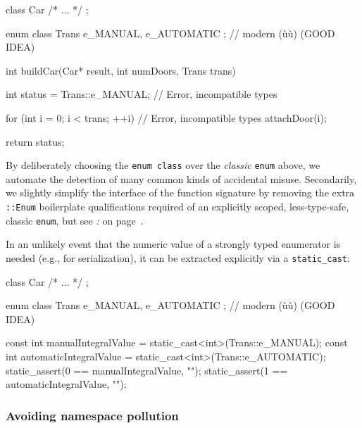 \begin{emcppslisting}[emcppsignore={Fails to build with all Declarations marked Error}]
class Car { /* ... */ };

enum class Trans { e_MANUAL, e_AUTOMATIC };  // modern (ù{}ù) (GOOD IDEA)

int buildCar(Car* result, int numDoors, Trans trans)
{
    int status = Trans::e_MANUAL;    // Error, incompatible types

    for (int i = 0; i < trans; ++i)  // Error, incompatible types
    {
         attachDoor(i);
    }

    return status;
}
\end{emcppslisting}

\noindent By deliberately choosing the \texttt{enum}~\texttt{class} over the
\emph{classic} \texttt{enum} above, we automate the detection of many common
kinds of accidental misuse. Secondarily, we slightly simplify the interface of the function signature by removing the extra \texttt{::Enum} boilerplate qualifications required of an explicitly
scoped, less-type-safe, classic \texttt{enum}, but see \textit{: } on page~\pageref{strong-typing-of-an-enum-class-can-be-counterproductive}.

In an unlikely event that the numeric value of a strongly typed
enumerator is needed (e.g., for serialization), it can be extracted
explicitly via a \texttt{static\_cast}:

\begin{emcppshiddenlisting}[emcppsbatch=e6]
class Car { /* ... */ };

enum class Trans { e_MANUAL, e_AUTOMATIC };  // modern (ù{}ù) (GOOD IDEA)
\end{emcppshiddenlisting}
\begin{emcppslisting}[emcppsbatch=e6]
const int manualIntegralValue    = static_cast<int>(Trans::e_MANUAL);
const int automaticIntegralValue = static_cast<int>(Trans::e_AUTOMATIC);
static_assert(0 == manualIntegralValue,    "");
static_assert(1 == automaticIntegralValue, "");
\end{emcppslisting}

\subsubsection[Avoiding namespace pollution]{Avoiding namespace pollution}\label{avoiding-namespace-pollution}

